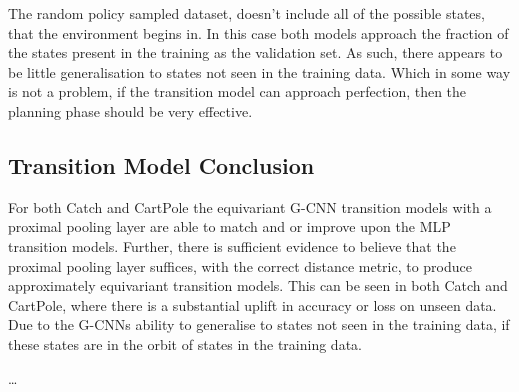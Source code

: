 The random policy sampled dataset, doesn't include all of the possible states, that the environment begins in. In this case both models approach the fraction of the states present in the training as the validation set. As such, there appears to be little generalisation to states not seen in the training data. Which in some way is not a problem, if the transition model can approach perfection, then the planning phase should be very effective.

\subsection{Transition Model Conclusion}
For both Catch and CartPole the equivariant G-CNN transition models with a proximal pooling layer are able to match and or improve upon the MLP transition models. Further, there is sufficient evidence to believe that the proximal pooling layer suffices, with the correct distance metric, to produce approximately equivariant transition models. This can be seen in both Catch and CartPole, where there is a substantial uplift in accuracy or loss on unseen data. Due to the G-CNNs ability to generalise to states not seen in the training data, if these states are in the orbit of states in the training data. 







\ldots


